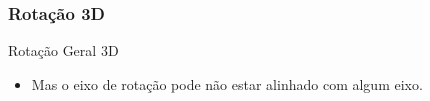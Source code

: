 \documentclass{beamer}
\begin{document}
\begin{frame}
\frametitle{Rotação 3D}


	\begin{block}{Rotação Geral 3D}
		\begin{itemize}
			\item Mas o eixo de rotação pode não estar alinhado com algum eixo.
		\end{itemize}
	\end{block}
	
		
		\begin{figure}[!h]
			\begin{center}
    				\qquad
      			\qquad
      			\qquad
      			\qquad
			\end{center}
		\end{figure}

	
\end{frame}
\end{document}
